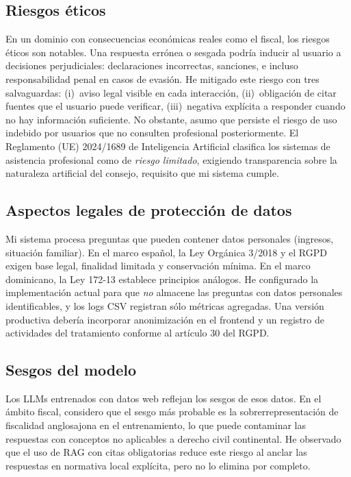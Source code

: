 \documentclass[11pt,a4paper]{article}
\begin{document}
\subsection{Riesgos éticos}

En un dominio con consecuencias económicas reales como el fiscal, los riesgos éticos son notables. Una respuesta errónea o sesgada podría inducir al usuario a decisiones perjudiciales: declaraciones incorrectas, sanciones, e incluso responsabilidad penal en casos de evasión. He mitigado este riesgo con tres salvaguardas: (i)~aviso legal visible en cada interacción, (ii)~obligación de citar fuentes que el usuario puede verificar, (iii)~negativa explícita a responder cuando no hay información suficiente. No obstante, asumo que persiste el riesgo de uso indebido por usuarios que no consulten profesional posteriormente. El Reglamento (UE) 2024/1689 de Inteligencia Artificial \cite{ue2024aiact} clasifica los sistemas de asistencia profesional como de \emph{riesgo limitado}, exigiendo transparencia sobre la naturaleza artificial del consejo, requisito que mi sistema cumple.

\subsection{Aspectos legales de protección de datos}

Mi sistema procesa preguntas que pueden contener datos personales (ingresos, situación familiar). En el marco español, la Ley Orgánica 3/2018 \cite{rd2018rgpd} y el RGPD exigen base legal, finalidad limitada y conservación mínima. En el marco dominicano, la Ley 172-13 \cite{do2013datos} establece principios análogos. He configurado la implementación actual para que \emph{no} almacene las preguntas con datos personales identificables, y los logs CSV registran sólo métricas agregadas. Una versión productiva debería incorporar anonimización en el frontend y un registro de actividades del tratamiento conforme al artículo 30 del RGPD.

\subsection{Sesgos del modelo}

Los LLMs entrenados con datos web reflejan los sesgos de esos datos. En el ámbito fiscal, considero que el sesgo más probable es la sobrerrepresentación de fiscalidad anglosajona en el entrenamiento, lo que puede contaminar las respuestas con conceptos no aplicables a derecho civil continental. He observado que el uso de RAG con citas obligatorias reduce este riesgo al anclar las respuestas en normativa local explícita, pero no lo elimina por completo.
\end{document}
